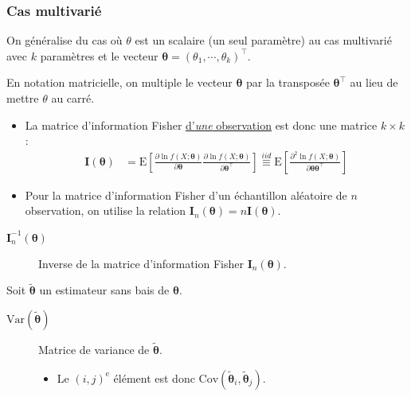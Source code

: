 \documentclass[10pt, french]{article}
\begin{document}
\begin{multicols*}{2}
\subsubsection{Cas multivarié}
On généralise du cas où $\theta$ est un scalaire (un seul paramètre) au cas multivarié avec $k$ paramètres et le vecteur $\bm{\theta}	=	(\theta_{1}, \cdots, \theta_{k})^{\top}$.\\


\begin{distributions}[Notation]
En notation matricielle, on multiple le vecteur $\bm{\theta}$ par la transposée $\bm{\theta}^{\top}$ au lieu de mettre $\theta$ au carré. 
\begin{itemize}
	\item	La matrice d'information Fisher \underline{d'\textit{une} observation} est donc une matrice $k \times k$:
\begin{align*}
	\bm{I}(\bm{\theta})
	&=	\text{E}\left[	
			\frac{\partial \ln f(X; \bm{\theta})}{\partial \bm{\theta}}
			\frac{\partial \ln f(X; \bm{\theta})}{\partial \bm{\theta}^{\top}}
		\right]
	\overset{iid}{\equiv}	\text{E}\left[	
			\frac{\partial^{2} \ln f(X; \bm{\theta})}{\partial \bm{\theta}\bm{\theta}^{\top}}
		\right]
\end{align*}
	\item	Pour la matrice d'information Fisher d'un échantillon aléatoire de $n$ observation, on utilise la relation $\bm{I}_{n}(\bm{\theta})	=	n\bm{I}(\bm{\theta})$.
\end{itemize}
\begin{description}
	\item[$\bm{I}^{-1}_{n}(\bm{\theta})$]	Inverse de la matrice d'information Fisher $\bm{I}_{n}(\bm{\theta})$.
\end{description}
\end{distributions}

Soit $\tilde{\bm{\theta}}$ un estimateur sans bais de $\bm{\theta}$. 

\begin{distributions}[Notation]
\begin{description}
	\item[$\text{Var}(\tilde{\bm{\theta}})$]	Matrice de variance de $\tilde{\bm{\theta}}$.
		\begin{itemize}
		\item	Le $(i, j)^{\text{e}}$ élément est donc $\text{Cov}(\tilde{\bm{\theta}}_{i}, \tilde{\bm{\theta}}_{j})$.
		\end{itemize}
\end{description}
\end{distributions}


\end{multicols*}
\end{document}
